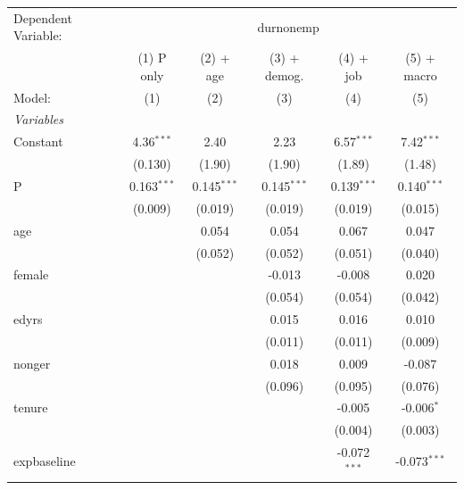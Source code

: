 
\begingroup
\centering
\begin{tabular}{lccccc}
   \tabularnewline \midrule \midrule
   Dependent Variable: & \multicolumn{5}{c}{durnonemp}\\
                   & (1) P only    & (2) + age     & (3) + demog.  & (4) + job      & (5) + macro \\   
   Model:          & (1)           & (2)           & (3)           & (4)            & (5)\\  
   \midrule
   \emph{Variables}\\
   Constant        & 4.36$^{***}$  & 2.40          & 2.23          & 6.57$^{***}$   & 7.42$^{***}$\\   
                   & (0.130)       & (1.90)        & (1.90)        & (1.89)         & (1.48)\\   
   P               & 0.163$^{***}$ & 0.145$^{***}$ & 0.145$^{***}$ & 0.139$^{***}$  & 0.140$^{***}$\\   
                   & (0.009)       & (0.019)       & (0.019)       & (0.019)        & (0.015)\\   
   age             &               & 0.054         & 0.054         & 0.067          & 0.047\\   
                   &               & (0.052)       & (0.052)       & (0.051)        & (0.040)\\   
   female          &               &               & -0.013        & -0.008         & 0.020\\   
                   &               &               & (0.054)       & (0.054)        & (0.042)\\   
   edyrs           &               &               & 0.015         & 0.016          & 0.010\\   
                   &               &               & (0.011)       & (0.011)        & (0.009)\\   
   nonger          &               &               & 0.018         & 0.009          & -0.087\\   
                   &               &               & (0.096)       & (0.095)        & (0.076)\\   
   tenure          &               &               &               & -0.005         & -0.006$^{*}$\\   
                   &               &               &               & (0.004)        & (0.003)\\   
   expbaseline     &               &               &               & -0.072$^{***}$ & -0.073$^{***}$\\   

\end{tabular}

